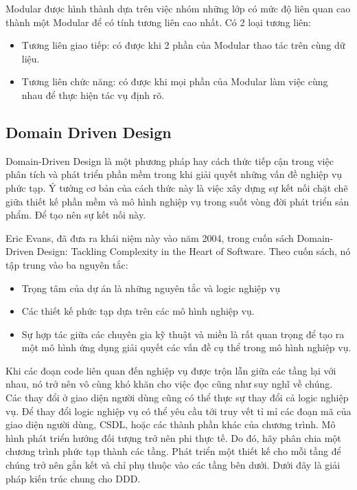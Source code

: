 Modular được hình thành dựa trên việc nhóm những lớp có mức độ liên quan cao thành một Modular để có tính tương liên cao nhất. Có 2 loại tương liên:

\begin{itemize}
	\item Tương liên giao tiếp: có được khi 2 phần của Modular thao tác trên cùng dữ liệu.
	\item Tương liên chức năng: có được khi mọi phần của Modular làm việc cùng nhau để thực hiện tác vụ định rõ.
\end{itemize}

\subsection{Domain Driven Design}

Domain-Driven Design là một phương pháp hay cách thức tiếp cận trong việc phân tích và phát triển phần mềm trong khi giải quyết những vấn đề nghiệp vụ phức tạp. Ý tưởng cơ bản của cách thức này là việc xây dựng sự kết nối chặt chẽ giữa thiết kế phần mềm và mô hình nghiệp vụ trong suốt vòng đời phát triển sản phẩm. Để tạo nên sự kết nối này.

Eric Evans, đã đưa ra khái niệm này vào năm 2004, trong cuốn sách Domain-Driven Design: Tackling Complexity in the Heart of Software. Theo cuốn sách, nó tập trung vào ba nguyên tắc:

\begin{itemize}
	\item Trọng tâm của dự án là những nguyên tắc và logic nghiệp vụ
	\item Các thiết kế phức tạp dựa trên các mô hình nghiệp vụ.
	\item Sự hợp tác giữa các chuyên gia kỹ thuật và miền là rất quan trọng để tạo ra một mô hình ứng dụng giải quyết các vấn đề cụ thể trong mô hình nghiệp vụ.
\end{itemize}

Khi các đoạn code liên quan đến nghiệp vụ được trộn lẫn giữa các tầng lại với nhau, nó trở nên vô cùng khó khăn cho việc đọc cũng như suy nghĩ về chúng. Các thay đổi ở giao diện người dùng cũng có thể thực sự thay đổi cả logic nghiệp vụ. Để thay đổi logic nghiệp vụ có thể yêu cầu tới truy vết tỉ mỉ các đoạn mã của giao diện người dùng, CSDL, hoặc các thành phần khác của chương trình. Mô hình phát triển hướng đối tượng trở nên phi thực tế. Do đó, hãy phân chia một chương trình phức tạp thành các tầng. Phát triển một thiết kế cho mỗi tầng để chúng trở nên gắn kết và chỉ phụ thuộc vào các tầng bên dưới. Dưới đây là giải pháp kiến trúc chung cho DDD.

